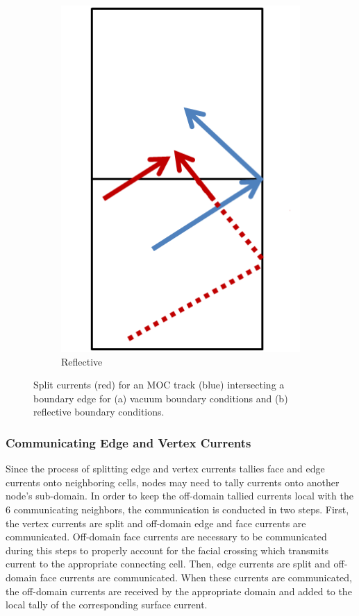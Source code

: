 \begin{figure}[h!]
\begin{subfigure}{0.45\textwidth}
		\includegraphics[width=\linewidth]{figures/DD/split-reflective.PNG}
		\caption{Reflective}
		\label{fig:split-reflective}
	\end{subfigure}
	\caption[]{Split currents (red) for an \ac{MOC} track (blue) intersecting a boundary edge for (a) vacuum boundary conditions and (b) reflective boundary conditions.}
	\label{fig:cmfd-split-current-boundary}
\end{figure}


\subsubsection{Communicating Edge and Vertex Currents}

Since the process of splitting edge and vertex currents tallies face and edge currents onto neighboring cells, nodes may need to tally currents onto another node's sub-domain. In order to keep the off-domain tallied currents local with the 6 communicating neighbors, the communication is conducted in two steps. First, the vertex currents are split and off-domain edge and face currents are communicated. Off-domain face currents are necessary to be communicated during this steps to properly account for the facial crossing which transmits current to the appropriate connecting cell. Then, edge currents are split and off-domain face currents are communicated. When these currents are communicated, the off-domain currents are received by the appropriate domain and added to the local tally of the corresponding surface current.

